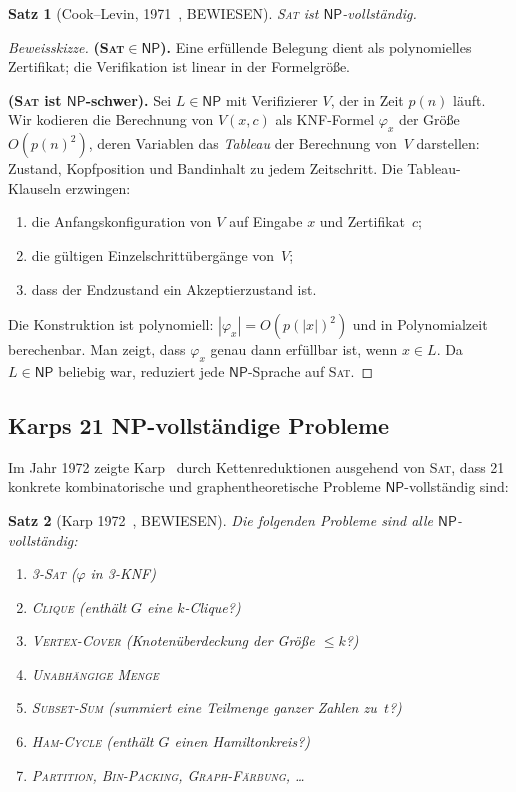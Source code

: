 \documentclass[12pt,a4paper]{amsart}
\newtheorem{theorem}{Satz}[section]
\theoremstyle{definition}
\newcommand{\NP}{\mathsf{NP}}
\newcommand{\SAT}{\textsc{Sat}}
\newcommand{\CLIQUE}{\textsc{Clique}}
\newcommand{\VC}{\textsc{Vertex-Cover}}
\newcommand{\SUBSET}{\textsc{Subset-Sum}}
\newcommand{\HAM}{\textsc{Ham-Cycle}}
\begin{document}
\begin{theorem}[Cook--Levin, 1971~\cite{cook1971}, BEWIESEN]
\label{thm:cooklevin}
\SAT{} ist $\NP$-vollständig.
\end{theorem}

\begin{proof}[Beweisskizze]
\textbf{(\SAT{}$\in\NP$).}  Eine erfüllende Belegung dient als polynomielles
Zertifikat; die Verifikation ist linear in der Formelgröße.

\textbf{(\SAT{} ist $\NP$-schwer).}  Sei $L\in\NP$ mit Verifizierer $V$,
der in Zeit $p(n)$ läuft.  Wir kodieren die Berechnung von $V(x,c)$ als
KNF-Formel $\varphi_x$ der Größe $O(p(n)^2)$, deren Variablen das
\emph{Tableau} der Berechnung von~$V$ darstellen: Zustand, Kopfposition und
Bandinhalt zu jedem Zeitschritt.  Die Tableau-Klauseln erzwingen:
\begin{enumerate}[label=(\roman*)]
  \item die Anfangskonfiguration von $V$ auf Eingabe $x$ und Zertifikat~$c$;
  \item die gültigen Einzelschrittübergänge von~$V$;
  \item dass der Endzustand ein Akzeptierzustand ist.
\end{enumerate}
Die Konstruktion ist polynomiell: $|\varphi_x| = O(p(|x|)^2)$ und in
Polynomialzeit berechenbar.  Man zeigt, dass $\varphi_x$ genau dann erfüllbar
ist, wenn $x\in L$.  Da $L\in\NP$ beliebig war, reduziert jede
$\NP$-Sprache auf \SAT{}.
\end{proof}

\subsection{Karps 21 NP-vollständige Probleme}

Im Jahr 1972 zeigte Karp~\cite{karp1972} durch Kettenreduktionen ausgehend
von \SAT{}, dass 21 konkrete kombinatorische und graphentheoretische Probleme
$\NP$-vollständig sind:

\begin{theorem}[Karp 1972~\cite{karp1972}, BEWIESEN]
Die folgenden Probleme sind alle $\NP$-vollständig:
\begin{enumerate}[label=(\arabic*)]
  \item \textsc{3-Sat} ($\varphi$ in 3-KNF)
  \item \CLIQUE{} (enthält $G$ eine $k$-Clique?)
  \item \VC{} (Knotenüberdeckung der Größe $\leq k$?)
  \item \textsc{Unabhängige Menge}
  \item \SUBSET{} (summiert eine Teilmenge ganzer Zahlen zu~$t$?)
  \item \HAM{} (enthält $G$ einen Hamiltonkreis?)
  \item \textsc{Partition}, \textsc{Bin-Packing}, \textsc{Graph-Färbung}, \ldots
\end{enumerate}
\end{theorem}
\end{document}

